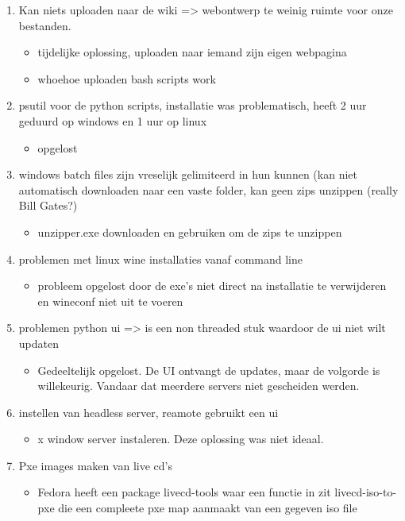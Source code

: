 \documentclass[DIV=calc]{scrartcl}
\begin{document}
\begin{enumerate}
	\item Kan niets uploaden naar de wiki => webontwerp te weinig ruimte voor onze bestanden.
	\begin{itemize}
		\item tijdelijke oplossing, uploaden naar iemand zijn eigen webpagina
		\item whoehoe uploaden bash scripts work
	\end{itemize}
	\item psutil voor de python scripts, installatie was problematisch, heeft 2 uur geduurd op windows en 1 uur op linux
	\begin{itemize}
		\item opgelost
	\end{itemize}
	\item windows batch files zijn vreselijk gelimiteerd in hun kunnen (kan niet automatisch downloaden naar een vaste folder, kan geen zips unzippen (really Bill Gates?)
		\begin{itemize}
		\item unzipper.exe downloaden en gebruiken om de zips te unzippen
	\end{itemize}
	\item problemen met linux wine installaties vanaf command line
	\begin{itemize}
		\item probleem opgelost door de exe's niet direct na installatie te verwijderen en wineconf niet uit te voeren
	\end{itemize}
	\item problemen python ui => is een non threaded stuk waardoor de ui niet wilt updaten
	\begin{itemize}
		\item Gedeeltelijk opgelost. De UI ontvangt de updates, maar de volgorde is willekeurig. Vandaar dat meerdere servers niet gescheiden werden.
	\end{itemize}
	\item instellen van headless server, reamote gebruikt een ui
	\begin{itemize}
		\item x window server instaleren. Deze oplossing was niet ideaal.
	\end{itemize}
	\item Pxe images maken van live cd's
	\begin{itemize}
		\item Fedora heeft een package livecd-tools waar een functie in zit livecd-iso-to-pxe die een compleete pxe map aanmaakt van een gegeven iso file

\end{itemize}
\end{enumerate}
\end{document}
